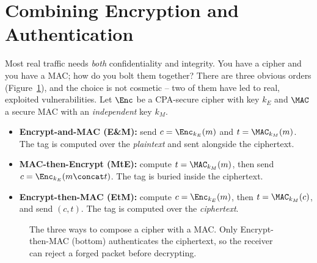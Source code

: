 \section{Combining Encryption and Authentication}
\label{ch15:combining}

Most real traffic needs \emph{both} confidentiality and integrity. You have a cipher and you have a MAC; how do you bolt them together? There are three obvious orders (Figure~\ref{ch15:fig-compose}), and the choice is not cosmetic -- two of them have led to real, exploited vulnerabilities. Let $\Enc$ be a CPA-secure cipher with key $k_E$ and $\MAC$ a secure MAC with an \emph{independent} key $k_M$.

\begin{itemize}
  \item \textbf{Encrypt-and-MAC (E\&M):} send $c = \Enc_{k_E}(m)$ and $t = \MAC_{k_M}(m)$. The tag is computed over the \emph{plaintext} and sent alongside the ciphertext.
  \item \textbf{MAC-then-Encrypt (MtE):} compute $t = \MAC_{k_M}(m)$, then send $c = \Enc_{k_E}(m\concat t)$. The tag is buried inside the ciphertext.
  \item \textbf{Encrypt-then-MAC (EtM):} compute $c = \Enc_{k_E}(m)$, then $t = \MAC_{k_M}(c)$, and send $(c,t)$. The tag is computed over the \emph{ciphertext}.
\end{itemize}

\begin{figure}[H]
\centering
{}
\caption{The three ways to compose a cipher with a MAC. Only Encrypt-then-MAC (bottom) authenticates the ciphertext, so the receiver can reject a forged packet before decrypting.}
\label{ch15:fig-compose}
\end{figure}

